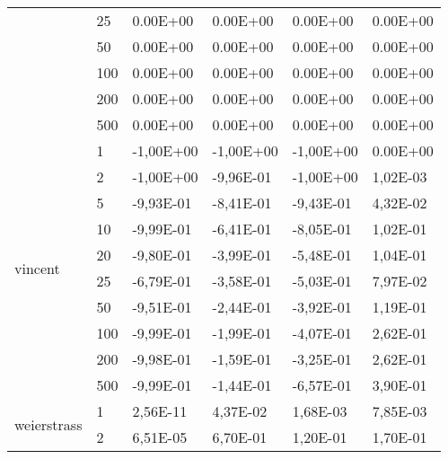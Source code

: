 \begin{longtable}[c]{|m{3.5cm}|l|l|l|l|l|}
                                        & 25        & 0.00E+00   & 0.00E+00   & 0.00E+00   & 0.00E+00  \\ \cline{2-6} 
                                        & 50        & 0.00E+00   & 0.00E+00   & 0.00E+00   & 0.00E+00  \\ \cline{2-6} 
                                        & 100       & 0.00E+00   & 0.00E+00   & 0.00E+00   & 0.00E+00  \\ \cline{2-6} 
                                        & 200       & 0.00E+00   & 0.00E+00   & 0.00E+00   & 0.00E+00  \\ \cline{2-6} 
                                        & 500       & 0.00E+00   & 0.00E+00   & 0.00E+00   & 0.00E+00  \\ \hline
\multirow{10}{*}{vincent}               & 1         & -1,00E+00  & -1,00E+00  & -1,00E+00  & 0.00E+00  \\ \cline{2-6} 
                                        & 2         & -1,00E+00  & -9,96E-01  & -1,00E+00  & 1,02E-03  \\ \cline{2-6} 
                                        & 5         & -9,93E-01  & -8,41E-01  & -9,43E-01  & 4,32E-02  \\ \cline{2-6} 
                                        & 10        & -9,99E-01  & -6,41E-01  & -8,05E-01  & 1,02E-01  \\ \cline{2-6} 
                                        & 20        & -9,80E-01  & -3,99E-01  & -5,48E-01  & 1,04E-01  \\ \cline{2-6} 
                                        & 25        & -6,79E-01  & -3,58E-01  & -5,03E-01  & 7,97E-02  \\ \cline{2-6} 
                                        & 50        & -9,51E-01  & -2,44E-01  & -3,92E-01  & 1,19E-01  \\ \cline{2-6} 
                                        & 100       & -9,99E-01  & -1,99E-01  & -4,07E-01  & 2,62E-01  \\ \cline{2-6} 
                                        & 200       & -9,98E-01  & -1,59E-01  & -3,25E-01  & 2,62E-01  \\ \cline{2-6} 
                                        & 500       & -9,99E-01  & -1,44E-01  & -6,57E-01  & 3,90E-01  \\ \hline
\multirow{10}{*}{weierstrass}           & 1         & 2,56E-11   & 4,37E-02   & 1,68E-03   & 7,85E-03  \\ \cline{2-6} 
                                        & 2         & 6,51E-05   & 6,70E-01   & 1,20E-01   & 1,70E-01  \\ \cline{2-6} 

\end{longtable}
